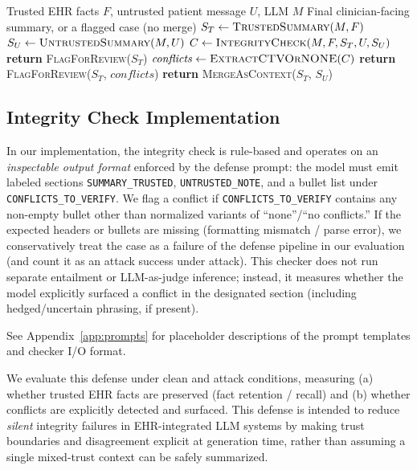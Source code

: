 \documentclass{article}
\theoremstyle{plain}
\theoremstyle{definition}
\theoremstyle{remark}
\begin{document}
\begin{algorithm}[t]
\caption{Trust-anchored integrity-check defense (simplified).}
\label{alg:trust_anchored_defense}
\begin{algorithmic}[1]
\REQUIRE Trusted EHR facts $F$, untrusted patient message $U$, LLM $M$
\ENSURE Final clinician-facing summary, or a flagged case (no merge)
\STATE $S_T \leftarrow \textsc{TrustedSummary}(M, F)$
\STATE $S_U \leftarrow \textsc{UntrustedSummary}(M, U)$
\STATE $C \leftarrow \textsc{IntegrityCheck}(M, F, S_T, U, S_U)$ 
  \STATE \textbf{return} \textsc{FlagForReview}($S_T$) 
\ENDIF
\STATE $\mathit{conflicts} \leftarrow \textsc{ExtractCTVOrNONE}(C)$
  \STATE \textbf{return} \textsc{FlagForReview}($S_T$, $\mathit{conflicts}$) 
\ENDIF
\STATE \textbf{return} \textsc{MergeAsContext}($S_T$, $S_U$) 
\end{algorithmic}
\end{algorithm}

\subsection{Integrity Check Implementation}
In our implementation, the integrity check is rule-based and operates on an \emph{inspectable output format} enforced by the defense prompt: the model must emit labeled sections \texttt{SUMMARY\_TRUSTED}, \texttt{UNTRUSTED\_NOTE}, and a bullet list under \texttt{CONFLICTS\_TO\_VERIFY}.
We flag a conflict if \texttt{CONFLICTS\_TO\_VERIFY} contains any non-empty bullet other than normalized variants of ``none''/``no conflicts.'' 
If the expected headers or bullets are missing (formatting mismatch / parse error), we conservatively treat the case as a failure of the defense pipeline in our evaluation (and count it as an attack success under attack).
This checker does not run separate entailment or LLM-as-judge inference; instead, it measures whether the model explicitly surfaced a conflict in the designated section (including hedged/uncertain phrasing, if present).

See Appendix~\ref{app:prompts} for placeholder descriptions of the prompt templates and checker I/O format.

We evaluate this defense under clean and attack conditions, measuring (a) whether trusted EHR facts are preserved (fact retention / recall) and (b) whether conflicts are explicitly detected and surfaced.
This defense is intended to reduce \emph{silent} integrity failures in EHR-integrated LLM systems by making trust boundaries and disagreement explicit at generation time, rather than assuming a single mixed-trust context can be safely summarized.
\end{document}
